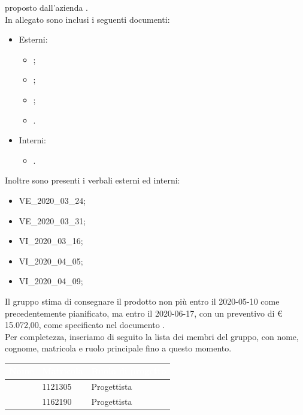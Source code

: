 \documentclass[12pt]{letter}
\begin{document}
\begin{letter}
        proposto dall'azienda \textbf{\Proponente{}}.\\
        In allegato sono inclusi i seguenti documenti:
        \begin{itemize}
            \item Esterni:
            \begin{itemize}
                \item {};
                \item {};
                \item {};
                \item {}.
            \end{itemize}
            \item Interni:
            \begin{itemize}
                \item {}.
            \end{itemize}
        \end{itemize}
        Inoltre sono presenti i verbali esterni ed interni:
        \begin{itemize}
            \item VE\_2020\_03\_24;
            \item VE\_2020\_03\_31;
            \item VI\_2020\_03\_16;
            \item VI\_2020\_04\_05;
            \item VI\_2020\_04\_09;
        \end{itemize}
        Il gruppo stima di consegnare il prodotto non più entro il 2020-05-10 come precedentemente pianificato, ma entro il 2020-06-17, con un preventivo di \euro{} 15.072,00, come specificato nel documento \PdP{}.\\
        Per completezza, inseriamo di seguito la lista dei membri del gruppo, con nome, cognome, matricola e ruolo principale fino a questo momento.
        {
            \renewcommand{\arraystretch}{1.5}
            \begin{longtable}{ C{4cm} C{3cm} C{6cm} }
                \textcolor{white}{\textbf{Nome}} & \textcolor{white}{\textbf{Matricola}} & \textcolor{white}{\textbf{Ruolo di progetto}}\\
                \endhead 
                \MC{} & 1121305 & Progettista \\
                \LD{} & 1162190 & Progettista \\

\end{longtable}}
\end{letter}
\end{document}
